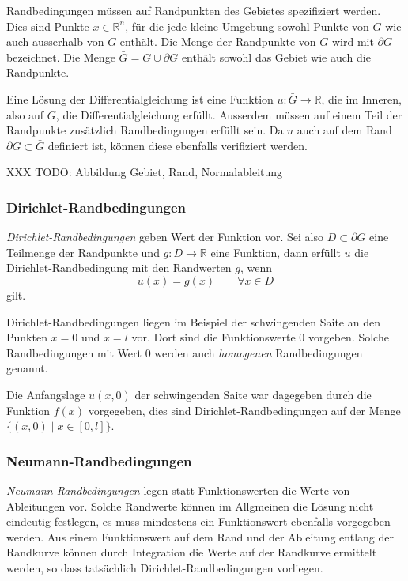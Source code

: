 Randbedingungen müssen auf Randpunkten des Gebietes spezifiziert werden.
Dies sind Punkte $x\in\mathbb{R}^n$, für die jede kleine Umgebung sowohl
Punkte von $G$ wie auch ausserhalb von $G$ enthält.
Die Menge der Randpunkte von $G$ wird mit $\partial G$ bezeichnet.
Die Menge $\bar{G}=G\cup \partial G$ enthält sowohl das Gebiet
wie auch die Randpunkte.

Eine Lösung der Differentialgleichung ist eine Funktion
$u\colon\bar{G}\to\mathbb{R}$, die im Inneren, also auf $G$,
die Differentialgleichung erfüllt.
Ausserdem müssen auf einem Teil der Randpunkte zusätzlich
Randbedingungen erfüllt sein.
Da $u$ auch auf dem Rand $\partial G\subset\bar{G}$ definiert
ist, können diese ebenfalls verifiziert werden.

{\color{red}
\bigskip

\noindent
XXX TODO: Abbildung Gebiet, Rand, Normalableitung
}

\subsubsection{Dirichlet-Randbedingungen}
%
{\em Dirichlet-Randbedingungen} geben Wert der Funktion vor.
Sei also $D\subset\partial G$ eine Teilmenge der Randpunkte
und $g\colon D\to\mathbb{R}$ eine Funktion, dann erfüllt $u$
die Dirichlet-Randbedingung mit den Randwerten $g$, wenn
\[
u(x) = g(x)\qquad \forall x\in D
\]
gilt.

Dirichlet-Randbedingungen liegen im Beispiel der schwingenden Saite
an den Punkten $x=0$ und $x=l$ vor.
Dort sind die Funktionswerte $0$ vorgeben.
Solche Randbedingungen mit Wert 0 werden auch {\em homogenen} 
Randbedingungen genannt.

Die Anfangslage $u(x,0)$ der schwingenden Saite war dagegeben durch
die Funktion $f(x)$ vorgegeben, dies sind Dirichlet-Randbedingungen
auf der Menge $\{(x,0)\mid x\in[0,l]\}$.

\subsubsection{Neumann-Randbedingungen}
%
{\em Neumann-Randbedingungen} legen statt Funktionswerten die Werte
von Ableitungen vor.
Solche Randwerte können im Allgmeinen die Lösung nicht eindeutig
festlegen, es muss mindestens ein Funktionswert ebenfalls vorgegeben
werden.
Aus einem Funktionswert auf dem Rand und der Ableitung entlang
der Randkurve können durch Integration die Werte auf der Randkurve
ermittelt werden, so dass tatsächlich Dirichlet-Randbedingungen
vorliegen.


